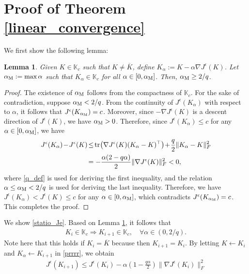 \documentclass[preprint,5p,times,twocolumn]{elsarticle}
\newtheorem{lem}{Lemma}
\def\tr{{\rm tr} \hspace{0.5mm}}
\def\h{\hspace{-0.5mm}}
\def\H{\hspace{-1.0mm}}
\begin{document}
\section{Proof of Theorem \ref{linear_convergence}} \label{prf_linear_convergence}
We first show the following lemma: 
\begin{lem}\label{lem10}
    Given $K \in \mathbb K_c$ such that $K \not=\overline{K}$, define $K_{\alpha} := K - \alpha \nabla J^{\epsilon}(K)$. Let $\alpha_{\rm M}:= \max \alpha$ such that $K_{\alpha} \in \mathbb K_c$ for all $\alpha \in [0, \alpha_{\rm M}]$. Then, $\alpha_{\rm M} \geq 2/q$. 
\end{lem}
\begin{proof}
    The existence of $\alpha_{\rm M}$ follows from the compactness of $\mathbb K_c$. For the sake of contradiction, suppose $\alpha_{\rm M} < 2/q$. From the continuity of $J^{\epsilon}(K_{\alpha})$ with respect to $\alpha$, it follows that $J^{\epsilon}(K_{\alpha_{\rm M}}) = c$. Moreover, since $-\nabla J^{\epsilon}(K)$ is a descent direction of $J^{\epsilon}(K)$, we have $\alpha_{\rm M} > 0$. Therefore, since $J^{\epsilon}(K_{\alpha}) \leq c$ for any $\alpha \in [0, \alpha_{\rm M}]$, we have 
    \begin{align}
        J^{\epsilon}(K_{\alpha}) \h-\h J^{\epsilon}(K) \h&\leq\h \tr \H \left(\nabla J^{\epsilon}(K)(K_{\alpha}-K)^{\top}\right) \h+\h \frac{q}{2}\|K_{\alpha}-K\|_F^2 \nonumber \\
        &= -\frac{\alpha(2-q\alpha)}{2}\|\nabla J^{\epsilon}(K)\|_F^2 < 0, \label{prrrr}
    \end{align}
    where \eqref{q_def} is used for deriving the first inequality, and the relation $\alpha \leq \alpha_{\rm M} < 2/q$ is used for deriving the last inequality. Therefore, we have $J^{\epsilon}(K_{\alpha}) < J^{\epsilon}(K) \leq c$ for any $\alpha \in [0, \alpha_{\rm M}]$, which contradicts $J^{\epsilon}(K_{\alpha_{\rm M}}) = c$. This completes the proof. 
\end{proof}
We show \eqref{statio_Je}. Based on Lemma \ref{lem10}, it follows that 
\begin{align}
    K_i \in \mathbb K_c \Rightarrow K_{i+1} \in \mathbb K_c, \quad \forall \alpha \in (0, 2/q). 
\end{align}
Note here that this holds if $K_i = \overline{K}$ because then $K_{i+1} = K_i$. By letting $K \leftarrow K_i$ and $K_{\alpha} \leftarrow K_{i+1}$ in \eqref{prrrr}, we obtain
\begin{align}\label{interm}
    J^{\epsilon}(K_{i+1}) \leq J^{\epsilon}(K_i) - \alpha\left(1 - \frac{q\alpha}{2}\right) \|\nabla J^{\epsilon}(K_i)\|_F^2
\end{align}
\end{document}
